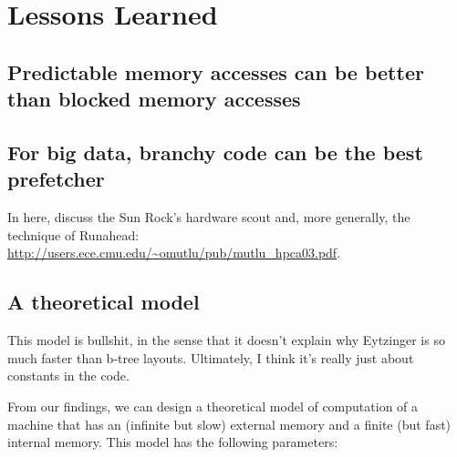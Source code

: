 \documentclass{patmorin}
\begin{document}
\section{Lessons Learned}

\subsection{Predictable memory accesses can be better than blocked
            memory accesses}

\subsection{For big data, branchy code can be the best prefetcher}

In here, discuss the Sun Rock's hardware scout and, more generally, the technique of Runahead: \url{http://users.ece.cmu.edu/~omutlu/pub/mutlu_hpca03.pdf}.

\subsection{A theoretical model}

This model is bullshit, in the sense that it doesn't explain why Eytzinger
is so much faster than b-tree layouts.  Ultimately, I think it's really just about constants in the code.


From our findings, we can design a theoretical model of computation of
a machine that has an (infinite but slow) external memory and a finite
(but fast) internal memory.  This model has the following parameters:
\end{document}
